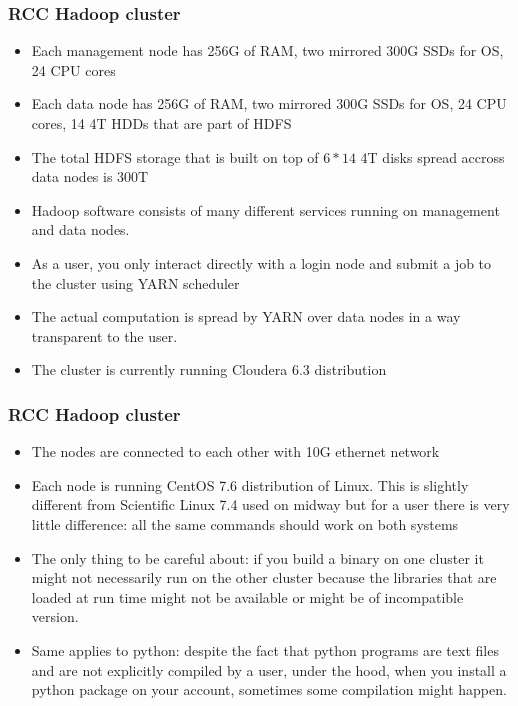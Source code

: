 \documentclass{beamer}
\begin{document}
\begin{frame}
  \frametitle{RCC Hadoop cluster}
  \begin{itemize}
  \item Each management node has 256G of RAM, two mirrored 300G SSDs for OS, 24 CPU cores
  \item Each data node has 256G of RAM, two mirrored 300G SSDs for OS, 24 CPU cores, 14 4T HDDs that are part of HDFS
  \item The total HDFS storage that is built on top of $6*14$ 4T disks spread accross data nodes is 300T
  \item Hadoop software consists of many different services running on management and data nodes.
  \item As a user, you only interact directly with a login node and submit a job to the cluster using YARN scheduler
  \item The actual computation is spread by YARN over data nodes in a way transparent to the user.
  \item The cluster is currently running Cloudera 6.3 distribution
  \end{itemize}
\end{frame}


\begin{frame}
  \frametitle{RCC Hadoop cluster}
  \begin{itemize}
  \item The nodes are connected to each other with 10G ethernet network
  \item Each node is running CentOS 7.6 distribution of Linux. This is slightly different from Scientific Linux 7.4 used on midway
    but for a user there is very little difference: all the same commands should work on both systems
  \item The only thing to be careful about: if you build a binary on one cluster it might not necessarily run on the other cluster
    because the libraries that are loaded at run time might not be available or might be of incompatible version.
  \item Same applies to python: despite the fact that python programs are text files and are not explicitly compiled by a user,
    under the hood, when you install a python package on your account, sometimes some compilation might happen.
  \end{itemize}
\end{frame}
\end{document}
